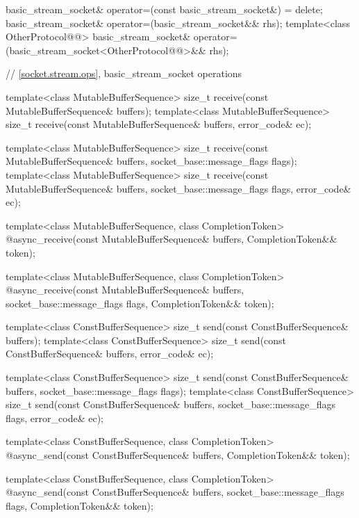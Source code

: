 \begin{codeblock}
{{    basic_stream_socket& operator=(const basic_stream_socket&) = delete;
    basic_stream_socket& operator=(basic_stream_socket&& rhs);
    template<class OtherProtocol@@>
      basic_stream_socket& operator=(basic_stream_socket<OtherProtocol@@>&& rhs);

    // \ref{socket.stream.ops}, basic_stream_socket operations

    template<class MutableBufferSequence>
      size_t receive(const MutableBufferSequence& buffers);
    template<class MutableBufferSequence>
      size_t receive(const MutableBufferSequence& buffers,
                     error_code& ec);

    template<class MutableBufferSequence>
      size_t receive(const MutableBufferSequence& buffers,
                     socket_base::message_flags flags);
    template<class MutableBufferSequence>
      size_t receive(const MutableBufferSequence& buffers,
                     socket_base::message_flags flags, error_code& ec);

    template<class MutableBufferSequence, class CompletionToken>
      @\DEDUCED@ async_receive(const MutableBufferSequence& buffers,
                            CompletionToken&& token);

    template<class MutableBufferSequence, class CompletionToken>
      @\DEDUCED@ async_receive(const MutableBufferSequence& buffers,
                            socket_base::message_flags flags,
                            CompletionToken&& token);

    template<class ConstBufferSequence>
      size_t send(const ConstBufferSequence& buffers);
    template<class ConstBufferSequence>
      size_t send(const ConstBufferSequence& buffers, error_code& ec);

    template<class ConstBufferSequence>
      size_t send(const ConstBufferSequence& buffers,
                  socket_base::message_flags flags);
    template<class ConstBufferSequence>
      size_t send(const ConstBufferSequence& buffers,
                  socket_base::message_flags flags, error_code& ec);

    template<class ConstBufferSequence, class CompletionToken>
      @\DEDUCED@ async_send(const ConstBufferSequence& buffers,
                         CompletionToken&& token);

    template<class ConstBufferSequence, class CompletionToken>
      @\DEDUCED@ async_send(const ConstBufferSequence& buffers,
                         socket_base::message_flags flags,
                         CompletionToken&& token);

}}
\end{codeblock}
